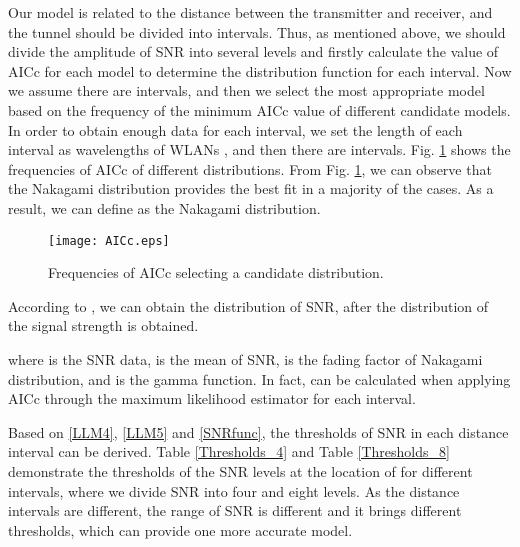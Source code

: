 \documentclass[conference]{IEEEtran}
\begin{document}
Our model is related to the distance between the transmitter and receiver, and the tunnel should be divided into intervals. Thus, as mentioned above, we should divide the amplitude of SNR into several levels and firstly calculate the value of AICc for each model to determine the distribution function for each interval. Now we assume there are  intervals, and then we select the most appropriate model based on the frequency of the minimum AICc value of different candidate models. In order to obtain enough data for each interval, we set the length of each interval as  wavelengths of WLANs \cite{A_statistical_model_for_indoor_office_wireless_sensor_channels}, and then there are  intervals. Fig. \ref{AICc} shows the frequencies of AICc of different distributions. From Fig. \ref{AICc}, we can observe that the Nakagami distribution provides the best fit in a majority of the cases. As a result, we can define  as the Nakagami distribution.

\begin{figure}[tp]
\centering
\texttt{[image: AICc.eps]}
\caption{Frequencies of AICc selecting a candidate distribution.}
\label{AICc}
\end{figure}

According to \cite{Digital_Communication_over_Fading_Channels}, we can obtain the distribution of SNR,  after the distribution of the signal strength is obtained.


where  is the SNR data,  is the mean of SNR,  is the fading factor of Nakagami distribution, and  is the gamma function. In fact,  can be calculated when applying AICc through the maximum likelihood estimator for each interval.

Based on \eqref{LLM4}, \eqref{LLM5} and \eqref{SNRfunc}, the thresholds  of SNR in each distance interval can be derived. Table \ref{Thresholds_4} and Table \ref{Thresholds_8} demonstrate the thresholds of the SNR levels at the location of  for different intervals, where we divide SNR into four and eight levels. As the distance intervals are different, the range of SNR is different and it brings different thresholds, which can provide one more accurate model.
\end{document}
